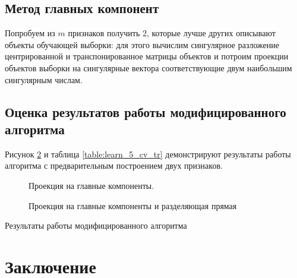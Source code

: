 \documentclass[%
bachelor,    %
subf,        %
href,        %
colorlinks,  %
]{disser}
\begin{document}
\subsection{Метод главных компонент}
Попробуем из $m$ признаков получить 2, которые лучше других описывают объекты обучающей выборки:
для этого вычислим сингулярное разложение центрированной и транспонированное матрицы объектов и потроим проекции объектов выборки на сингулярные вектора соответствующие двум наибольшим сингулярным числам.\cite{ssa}

\subsection{Оценка результатов работы модифицированного алгоритма}

Рисунок \ref{fig:learn_5} и таблица \ref{table:learn_5_cv_tr} демонстрируют результаты работы алгоритма с предварительным построением двух признаков.
\begin{figure}
	\centering		
	
	\caption{Проекция на главные компоненты.}
	\label{fig:scatter_5}
\end{figure}
\begin{figure}
	\centering		
	
	\caption{Проекция на главные компоненты и разделяющая прямая}
	\label{fig:learn_5}
\end{figure}

\begin{table}{}	
	\centering	
	
	\caption{Результаты работы модифицированного алгоритма}
	\label{table:learn_5_cv_tr}
\end{table}


\section{Заключение}



\printbibliography[heading=bibintoc]

\appendix
\end{document}
